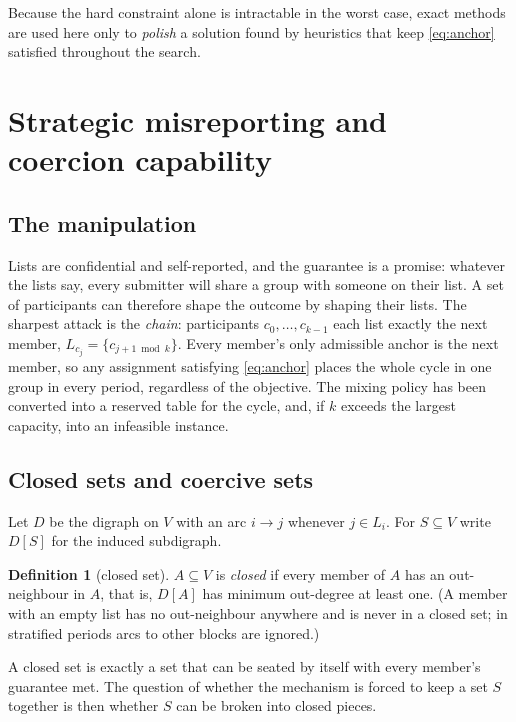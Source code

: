 \documentclass[11pt,a4paper]{article}
\theoremstyle{plain}
\theoremstyle{definition}
\newtheorem{definition}[theorem]{Definition}
\theoremstyle{remark}
\begin{document}
Because the hard constraint alone is intractable in the worst case, exact methods are used here only to \emph{polish} a solution found by heuristics that keep \eqref{eq:anchor} satisfied throughout the search.

\section{Strategic misreporting and coercion capability}
\label{sec:coercion}

\subsection{The manipulation}
Lists are confidential and self-reported, and the guarantee is a promise: whatever the lists say, every submitter will share a group with someone on their list. A set of participants can therefore shape the outcome by shaping their lists. The sharpest attack is the \emph{chain}: participants $c_0, \dots, c_{k-1}$ each list exactly the next member, $L_{c_j} = \{c_{j+1 \bmod k}\}$. Every member's only admissible anchor is the next member, so any assignment satisfying \eqref{eq:anchor} places the whole cycle in one group in every period, regardless of the objective. The mixing policy has been converted into a reserved table for the cycle, and, if $k$ exceeds the largest capacity, into an infeasible instance.

\subsection{Closed sets and coercive sets}
Let $D$ be the digraph on $V$ with an arc $i \to j$ whenever $j \in L_i$. For $S \subseteq V$ write $D[S]$ for the induced subdigraph.

\begin{definition}[closed set]\label{def:closed}
$A \subseteq V$ is \emph{closed} if every member of $A$ has an out-neighbour in $A$, that is, $D[A]$ has minimum out-degree at least one. (A member with an empty list has no out-neighbour anywhere and is never in a closed set; in stratified periods arcs to other blocks are ignored.)
\end{definition}
A closed set is exactly a set that can be seated by itself with every member's guarantee met. The question of whether the mechanism is forced to keep a set $S$ together is then whether $S$ can be broken into closed pieces.
\end{document}
